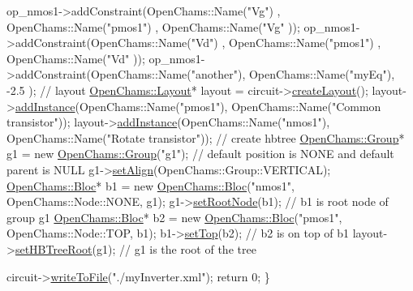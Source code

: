 \begin{DoxyCodeInclude}
    op\_nmos1->addConstraint(OpenChams::Name(\textcolor{stringliteral}{"Vg"})  , OpenChams::Name(\textcolor{stringliteral}{"pmos1"}) , OpenChams::Name(\textcolor{stringliteral}{"Vg"}  ));
    op\_nmos1->addConstraint(OpenChams::Name(\textcolor{stringliteral}{"Vd"})  , OpenChams::Name(\textcolor{stringliteral}{"pmos1"}) , OpenChams::Name(\textcolor{stringliteral}{"Vd"}  ));
    op\_nmos1->addConstraint(OpenChams::Name(\textcolor{stringliteral}{"another"}), OpenChams::Name(\textcolor{stringliteral}{"myEq"}), -2.5 );
    \textcolor{comment}{// layout}
    \mbox{\hyperlink{class_open_chams_1_1_layout}{OpenChams::Layout}}* layout = circuit->\mbox{\hyperlink{class_open_chams_1_1_circuit_a725a691b0117c4b913b54e7bfd92832f}{createLayout}}();
    layout->\mbox{\hyperlink{class_open_chams_1_1_layout_a4cc1899e9b782de44700fa0e4ac477ef}{addInstance}}(OpenChams::Name(\textcolor{stringliteral}{"pmos1"}), OpenChams::Name(\textcolor{stringliteral}{"Common transistor"}));
    layout->\mbox{\hyperlink{class_open_chams_1_1_layout_a4cc1899e9b782de44700fa0e4ac477ef}{addInstance}}(OpenChams::Name(\textcolor{stringliteral}{"nmos1"}), OpenChams::Name(\textcolor{stringliteral}{"Rotate transistor"}));
    \textcolor{comment}{// create hbtree}
    \mbox{\hyperlink{class_open_chams_1_1_group}{OpenChams::Group}}* g1 = \textcolor{keyword}{new} \mbox{\hyperlink{class_open_chams_1_1_group}{OpenChams::Group}}(\textcolor{stringliteral}{"g1"}); \textcolor{comment}{// default position
       is NONE and default parent is NULL}
    g1->\mbox{\hyperlink{class_open_chams_1_1_group_a9fc27b2bc4da99c723102153c4fbf1c0}{setAlign}}(OpenChams::Group::VERTICAL);
    \mbox{\hyperlink{class_open_chams_1_1_bloc}{OpenChams::Bloc}}* b1 = \textcolor{keyword}{new} \mbox{\hyperlink{class_open_chams_1_1_bloc}{OpenChams::Bloc}}(\textcolor{stringliteral}{"nmos1"}, OpenChams::Node::NONE,
       g1);
    g1->\mbox{\hyperlink{class_open_chams_1_1_group_adc93b900e943312e905182fe44f21225}{setRootNode}}(b1); \textcolor{comment}{// b1 is root node of group g1}
    \mbox{\hyperlink{class_open_chams_1_1_bloc}{OpenChams::Bloc}}* b2 = \textcolor{keyword}{new} \mbox{\hyperlink{class_open_chams_1_1_bloc}{OpenChams::Bloc}}(\textcolor{stringliteral}{"pmos1"}, OpenChams::Node::TOP, 
      b1);
    b1->\mbox{\hyperlink{class_open_chams_1_1_node_a32e2fbbb73c6b7ee4a30189cc30106bf}{setTop}}(b2); \textcolor{comment}{// b2 is on top of b1}
    layout->\mbox{\hyperlink{class_open_chams_1_1_layout_a6d828958e0faf1346b27276eab101858}{setHBTreeRoot}}(g1); \textcolor{comment}{// g1 is the root of the tree}

    circuit->\mbox{\hyperlink{class_open_chams_1_1_circuit_a2eb07935ec946a07edcee2255b781193}{writeToFile}}(\textcolor{stringliteral}{"./myInverter.xml"});
    \textcolor{keywordflow}{return} 0;
\}

\end{DoxyCodeInclude}


